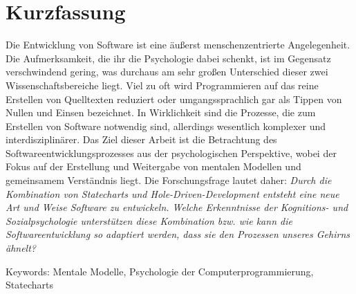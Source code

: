 \chapter{Kurzfassung}
Die Entwicklung von Software ist eine äußerst menschenzentrierte Angelegenheit.
Die Aufmerksamkeit, die ihr die Psychologie dabei schenkt, ist im Gegensatz verschwindend gering, was durchaus am sehr großen Unterschied dieser zwei Wissenschaftsbereiche liegt.
Viel zu oft wird Programmieren auf das reine Erstellen von Quelltexten reduziert oder umgangssprachlich gar als Tippen von Nullen und Einsen bezeichnet.
In Wirklichkeit sind die Prozesse, die zum Erstellen von Software notwendig sind, allerdings wesentlich komplexer und interdisziplinärer.
Das Ziel dieser Arbeit ist die Betrachtung des Softwareentwicklungsprozesses aus der psychologischen Perspektive, wobei der Fokus auf der Erstellung und Weitergabe von mentalen Modellen und gemeinsamem Verständnis liegt.
Die Forschungsfrage lautet daher: \emph{Durch die Kombination von Statecharts und Hole-Driven-Development entsteht eine neue Art und Weise Software zu entwickeln.
Welche Erkenntnisse der Kognitions- und Sozialpsychologie unterstützen diese Kombination bzw. wie kann die Softwareentwicklung so adaptiert werden, dass sie den Prozessen unseres Gehirns ähnelt?}

\vspace{2cm}
\noindent
Keywords: Mentale Modelle, Psychologie der Computerprogrammierung, Statecharts